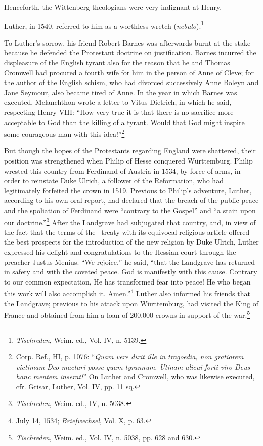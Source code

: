 Henceforth, the Wittenberg theologians were very indignant at
Henry.

Luther, in 1540, referred to him as a worthless wretch (\textit{nebulo}).\footnote{\textit{Tischreden}, Weim. ed., Vol. IV, n. 5139.}

To Luther’s sorrow, his friend Robert Barnes was afterwards burnt at the stake
because he defended the Protestant doctrine on justification. Barnes incurred
the displeasure of the English tyrant also for the reason that he and Thomas
Cromwell had procured a fourth wife for him in the person of Anne of
Cleve; for the author of the English schism, who had divorced successively
Anne Boleyn and Jane Seymour, also became tired of Anne. In the year in
which Barnes was executed, Melanchthon wrote a letter to Vitus Dietrich,
in which he said, respecting Henry VIII: “How very true it is that there is
no sacrifice more acceptable to God than the killing of a tyrant. Would
that God might inspire some courageous man with this idea!”\footnote
{Corp. Ref., HI, p. 1076: “\textit{Quam vere dixit ille in tragoedia, non gratiorem victimam
Deo mactari posse quam tyrannum. Utinam alicui forti viro Deus hanc mentem inserat!}”
On Luther and Cromwell, who was likewise executed, cfr. Grisar, Luther, Vol. IV, pp.
11 sq.}

But though the hopes of the Protestants regarding England were
shattered, their position was strengthened when Philip of Hesse
conquered Württemburg. Philip wrested this country from Ferdinand
of Austria in 1534, by force of arms, in order to reinstate Duke
Ulrich, a follower of the Reformation, who had legitimately forfeited
the crown in 1519. Previous to Philip’s adventure, Luther, according
to his own oral report, had declared that the breach of the public
peace and the spoliation of Ferdinand were “contrary to the Gospel”
and “a stain upon our doctrine.”\footnote{\textit{Tischreden}, Weim. ed., IV, n. 5038.}
 After the Landgrave had subjugated
that country, and, in view of the fact that the terms of the
--treaty with its equivocal religious article offered the best prospects
for the introduction of the new religion by Duke Ulrich, Luther
expressed his delight and congratulations to the Hessian court through
the preacher Justus Menius. “We rejoice,” he said, “that the Landgrave
has returned in safety and with the coveted peace. God is
manifestly with this cause. Contrary to our common expectation,
He has transformed fear into peace! He who began this work will
also accomplish it. Amen.”\footnote{July 14, 1534; \textit{Briefwechsel}, Vol. X, p. 63.}
 Luther also informed his friends that
the Landgrave; previous to his attack upon Württemburg, had visited
the King of France and obtained from him a loan of 200,000 crowns
in support of the war.\footnote{\textit{Tischreden}, Weim. ed., Vol. IV, n. 5038, pp. 628 and 630.}


